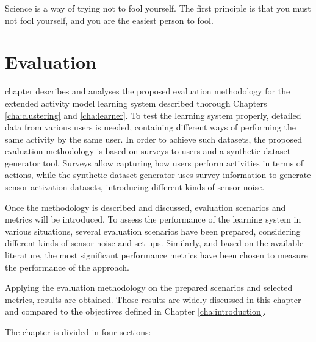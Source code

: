

\begin{savequote}[50mm]
Science is a way of trying not to fool yourself. The first principle is that you must not fool yourself, and you are the easiest person to fool.
\end{savequote}


\chapter{Evaluation}
\label{cha:evaluation}

\ifpdf
    \graphicspath{{6_evaluation/figures/PDF/}{6_evaluation/figures/PNG/}{6_evaluation/figures/}}
\else
    \graphicspath{{6_evaluation/figures/EPS/}{6_evaluation/figures/}}
\fi

 chapter describes and analyses the proposed evaluation methodology for the extended activity model learning system described thorough Chapters \ref{cha:clustering} and \ref{cha:learner}. To test the learning system properly, detailed data from various users is needed, containing different ways of performing the same activity by the same user. In order to achieve such datasets, the proposed evaluation methodology is based on surveys to users and a synthetic dataset generator tool. Surveys allow capturing how users perform activities in terms of actions, while the synthetic dataset generator uses survey information to generate sensor activation datasets, introducing different kinds of sensor noise. 

Once the methodology is described and discussed, evaluation scenarios and metrics will be introduced. To assess the performance of the learning system in various situations, several evaluation scenarios have been prepared, considering different kinds of sensor noise and set-ups. Similarly, and based on the available literature, the most significant performance metrics have been chosen to measure the performance of the approach.

Applying the evaluation methodology on the prepared scenarios and selected metrics, results are obtained. Those results are widely discussed in this chapter and compared to the objectives defined in Chapter \ref{cha:introduction}.

The chapter is divided in four sections:

